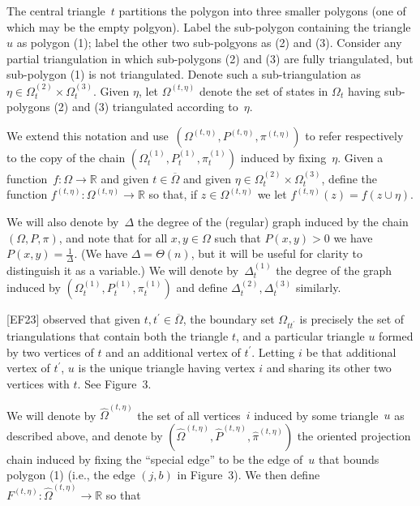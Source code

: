 The central triangle $t$ partitions the polygon into three smaller polygons (one of which may be the empty polgyon). Label the sub-polygon containing the triangle $u$ as polygon (1); label the other two sub-polgyons as (2) and (3). Consider any partial triangulation in which sub-polygons (2) and (3) are fully triangulated, but sub-polygon (1) is not triangulated. Denote such a sub-triangulation as $\eta\in\Omega_{t}^{(2)}\times\Omega_{t}^{(3)}$. Given $\eta$, let $\Omega^{(t,\eta)}$ denote the set of states in $\Omega_{t}$ having sub-polygons (2) and (3) triangulated according to $\eta$.\par




We extend this notation and use $\left(\Omega^{(t,\eta)},P^{(t,\eta)},\pi^{(t,\eta)}\right)$ to refer respectively to the copy of the chain $\left(\Omega_{t}^{(1)},P_{t}^{(1)},\pi_{t}^{(1)}\right)$ induced by fixing $\eta$. Given a function $f:\Omega\rightarrow\mathbb{R}$ and given $t\in\overline{\Omega}$ and given $\eta\in\Omega_{t}^{(2)}\times\Omega_{t}^{(3)}$, define the function $f^{(t,\eta)}:\Omega^{(t,\eta)}\rightarrow\mathbb{R}$ so that, if $z\in\Omega^{(t,\eta)}$ we let $f^{(t,\eta)}(z)=f(z\cup\eta)$.\par




We will also denote by $\Delta$ the degree of the (regular) graph induced by the chain $(\Omega,P,\pi)$, and note that for all $x,y\in\Omega$ such that $P(x,y)>0$ we have $P(x,y)=\frac{1}{\Delta}$. (We have $\Delta=\Theta(n)$, but it will be useful for clarity to distinguish it as a variable.) We will denote by $\Delta_{t}^{(1)}$ the degree of the graph induced by $\left(\Omega_{t}^{(1)},P_{t}^{(1)},\pi_{t}^{(1)}\right)$ and define $\Delta_{t}^{(2)},\Delta_{t}^{(3)}$ similarly.\par




[EF23] observed that given $t,t^{\prime}\in\overline{\Omega}$, the boundary set $\Omega_{tt^{\prime}}$ is precisely the set of triangulations that contain both the triangle $t$, and a particular triangle $u$ formed by two vertices of $t$ and an additional vertex of $t^{\prime}$. Letting $i$ be that additional vertex of $t^{\prime}$, $u$ is the unique triangle having vertex $i$ and sharing its other two vertices with $t$. See Figure 3.\par




We will denote by $\hat{\Omega}^{(t,\eta)}$ the set of all vertices $i$ induced by some triangle $u$ as described above, and denote by $\left(\hat{\Omega}^{(t,\eta)},\hat{P}^{(t,\eta)},\hat{\pi}^{(t,\eta)}\right)$ the oriented projection chain induced by fixing the “special edge” to be the edge of $u$ that bounds polygon (1) (i.e., the edge $(j,b)$ in Figure 3). We then define $F^{(t,\eta)}:\hat{\Omega}^{(t,\eta)}\rightarrow\mathbb{R}$ so that\par



